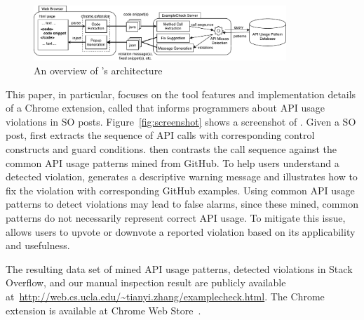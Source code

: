 \begin{figure}[!th]
\centering
\includegraphics[width=0.85\textwidth]{examplecheck-extension.pdf}
\caption{An overview of {\tool}'s architecture}
\label{fig:arch}
\end{figure}

This paper, in particular, focuses on the tool features and implementation details of a Chrome extension, called {\tool} that informs programmers about API usage violations in SO posts. Figure~\ref{fig:screenshot} shows a screenshot of {\tool}. Given a SO post, {\tool} first extracts the sequence of API calls with corresponding control constructs and guard conditions. {\tool} then contrasts the call sequence against the common API usage patterns mined from GitHub. To help users understand a detected violation, {\tool} generates a descriptive warning message and illustrates how to fix the violation with corresponding GitHub examples. Using common API usage patterns to detect violations may lead to false alarms, since these mined, common patterns do not necessarily represent correct API usage. To mitigate this issue, {\tool} allows users to upvote or downvote a reported violation based on its applicability and usefulness. 

The resulting data set of mined API usage patterns, detected violations in Stack Overflow, and our manual inspection result are publicly available at~{\small\url{http://web.cs.ucla.edu/~tianyi.zhang/examplecheck.html}}. The Chrome extension is available at Chrome Web Store~\cite{examplecheck}.



%
